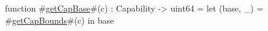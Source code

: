 function #\hyperref[sailMIPSzgetCapBase]{getCapBase}#(c) : Capability -> uint64 =
    let (base, _) = #\hyperref[sailMIPSzgetCapBounds]{getCapBounds}#(c) in
    base

